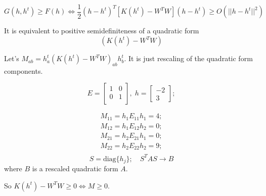 \documentclass{extreport}
\begin{document}
$$G(h,h^t) \geqslant F(h) \iff
\frac{1}{2} (h - h^t)^T \left[K(h^t) - W^TW\right] (h - h^t)
\geqslant O(||h - h^t||^2)$$

It is equivalent to positive semidefiniteness of a quadratic form
$$(K(h^t) - W^TW)$$

Let's $M_{ab} = h_a^t (K(h^t) - W^T W)_{ab} h_b^t$.
It is just rescaling of the quadratic form components.

\[
  E =
  \begin{bmatrix}
    1 & 0 \\
    0 & 1 \\
  \end{bmatrix}, \;
  h = \begin{bmatrix} -2 \\ 3 \end{bmatrix};
\]

\begin{align*}
  M_{11} = h_1 E_{11} h_1 = 4; \\
  M_{12} = h_1 E_{12} h_2 = 0; \\
  M_{21} = h_2 E_{21} h_1 = 0; \\
  M_{22} = h_2 E_{22} h_2 = 9; \\
\end{align*}
$$ S = \text{diag}\{h_j\}; \quad S^T A S \rightarrow B$$
where $B$ is a rescaled quadratic form $A$.

So $K(h^t) - W^TW \geqslant 0 \iff M \geqslant 0$.
\end{document}
